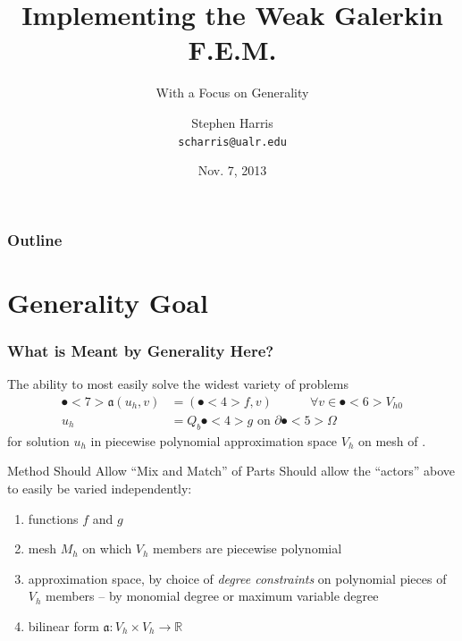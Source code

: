 \documentclass[compress]{beamer}
\title[Implementing WGFEM]{Implementing the Weak Galerkin F.E.M.}
\subtitle{With a Focus on Generality}
\author{Stephen Harris \\ \texttt{scharris@ualr.edu}}
\date{Nov. 7, 2013}
\begin{document}
\begin{frame}
  \titlepage
\end{frame}

\begin{frame}
  \frametitle{Outline}
  \tableofcontents[pausesections]
\end{frame}

\section{Generality Goal}

\begin{frame}
  \frametitle{What is Meant by Generality Here?}
  \pause
  The ability to most easily solve the widest variety of problems
    \begin{align*}
      \spot<7>{\mathfrak{a}}(u_h,v) & = (\spot<4>{f},v)\quad\quad\quad \forall{v} \in \spot<6>{V_{h0}} \\
      u_h & = Q_b \spot<4>{g} \text{ on } \partial\spot<5>{\Omega}
    \end{align*}
    for solution $u_h$ in piecewise polynomial approximation space $V_h$ on mesh  of .
  \pause

  \begin{block}{Method Should Allow ``Mix and Match'' of Parts}
    Should allow the ``actors'' above to easily be varied independently:
    \pause
    \begin{enumerate}[<+->]
      \item functions $f$ and $g$
      \item mesh $M_h$ on which $V_h$ members are piecewise polynomial
      \item approximation space, by choice of \emph{degree constraints} on polynomial pieces of $V_h$ members -- by monomial degree or maximum variable degree
      \item bilinear form $\mathfrak{a}: V_h \times V_h \rightarrow \mathbb{R}$
    \end{enumerate}
  \end{block}

\end{frame}
\end{document}
